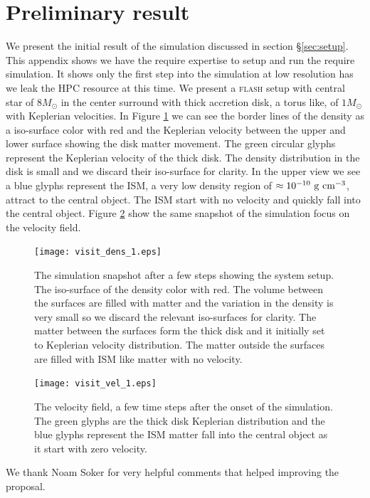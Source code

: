 \documentclass[a4paper,modern]{aastex62}
\def \cm{~\rm{cm}}
\def \g{~\rm{g}}
\begin{document}
\section{Preliminary result\label{app:preliminarty result}}
We present the initial result of the simulation discussed in section \S\ref{sec:setup}. This appendix shows we have the require expertise to setup and run the require simulation. It shows only the first step into the simulation at low resolution has we leak the HPC resource at this time. We present a \textsc{flash} setup with central star of $8M_\odot$ in the center surround with thick accretion disk, a torus like, of $1 M_\odot$ with Keplerian velocities. In Figure \ref{fig:preliminary-result-density} we can see the border lines of the density as a iso-surface color with red and the Keplerian velocity between the upper and lower surface showing the disk matter movement. The green circular glyphs represent the Keplerian velocity of the thick disk. The density distribution in the disk is small and we discard their iso-surface for clarity. In the upper view we see a blue glyphs represent the ISM, a very low density region of $\approx 10^{-10} \g\cm^{-3}$, attract to the central object. The ISM start with no velocity and quickly fall into the central object. Figure \ref{fig:preliminary-result-velocity} show the same snapshot of the simulation focus on the velocity field.  

\begin{figure}[t!]
\texttt{[image: visit\_dens\_1.eps]}
\caption{The simulation snapshot after a few steps showing the system setup. The iso-surface of the density color with red. The volume between the surfaces are filled with matter and the variation in the density is very small so we discard the relevant iso-surfaces for clarity. The matter between the surfaces form the thick disk and it initially set to Keplerian velocity distribution. The matter outside the surfaces are filled with ISM like matter with no velocity.}\label{fig:preliminary-result-density}
\end{figure}
%
\begin{figure}[t!]
\texttt{[image: visit\_vel\_1.eps]}
\caption{The velocity field, a few time steps after the onset of the simulation. The green glyphs are the thick disk Keplerian distribution and the blue glyphs represent the ISM matter fall into the central object as it start with zero velocity.}\label{fig:preliminary-result-velocity}
\end{figure}


\vspace{1cm}
We thank Noam Soker for very helpful comments that helped improving the proposal.
\end{document}
